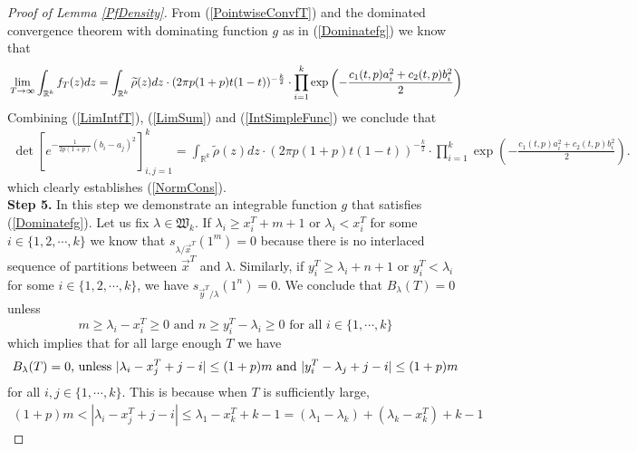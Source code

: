 \begin{proof}[Proof of Lemma \ref{PfDensity}]
From (\ref{PointwiseConvfT}) and the dominated convergence theorem with dominating function $g$ as in (\ref{Dominatefg}) we know that
\begin{equation}
	\begin{split}{\label{LimIntfT}}
	\lim_{T\rightarrow\infty}\int_{\mathbb{R}^{k}}f_T(z)dz=\int_{\mathbb{R}^k}\widetilde{\rho}(z)dz \cdot(2\pi p(1+p)t(1-t))^{-\frac{k}{2}}\cdot\prod_{i=1}^{k}\exp\left(-\frac{c_{1}(t,p)a_i^2+c_2(t,p)b_i^2}{2}\right)
\end{split}
\end{equation}
Combining (\ref{LimIntfT}), (\ref{LimSum}) and (\ref{IntSimpleFunc}) we conclude that
\begin{equation}
	\begin{split}
		\det\left[e^{-\frac{1}{2p(1+p)}(b_i-a_j)^2}\right]_{i,j=1}^{k}=\int_{\mathbb{R}^k}\widetilde{\rho}(z)dz\cdot(2\pi p(1+p)t(1-t))^{-\frac{k}{2}}\cdot\prod_{i=1}^{k}\exp\left(-\frac{c_1(t,p)a_i^2+c_2(t,p)b_i^2}{2}\right).
	\end{split}
\end{equation}
which clearly establishes (\ref{NormCons}).\\
\textbf{Step 5. }In this step we demonstrate an integrable function $g$ that satisfies (\ref{Dominatefg}). Let us fix $\lambda\in\mathfrak{W}_k$. If $\lambda_i\geq x_{i}^T+m+1$ or $\lambda_i<x_i^T$ for some $i\in\{1,2,\cdots,k\}$ we know that $s_{\lambda/\vec{x}^T}(1^m)=0$ because there is no interlaced sequence of partitions between $\vec{x}^T$ and $\lambda$. Similarly, if $y_{i}^T\geq \lambda_i+n+1$ or $y_{i}^T< \lambda_i$ for some $i\in\{1,2,\cdots,k\}$, we have $s_{\vec{y}^T/\lambda}(1^n)=0$. We conclude that $B_{\lambda}(T)=0$ unless
$$m\geq \lambda_i-x^{T}_i\geq 0\text{ and } n\geq y^{T}_i-\lambda_i\geq 0\text{ for all } i\in\{1,\cdots,k\}$$
which implies that for all large enough $T$ we have
\begin{equation}{\label{BLambda0unless}}
	\begin{split}
		B_{\lambda}(T)=0 \text{, unless }|\lambda_{i}-x_{j}^T+j-i|\leq (1+p)m \text{ and }|y_{i}^T-\lambda_{j}+j-i|\leq (1+p)m
	\end{split}
\end{equation}
for all $i,j\in\{1,\cdots, k\}$. This is because when $T$ is sufficiently large,
\begin{equation}
	\begin{split}
		(1+p)m<|\lambda_i-x^{T}_{j}+j-i|\leq \lambda_1-x^{T}_k+k-1=(\lambda_1-\lambda_k)+(\lambda_k-x^{T}_k)+k-1
	\end{split}

\end{equation}
\end{proof}
